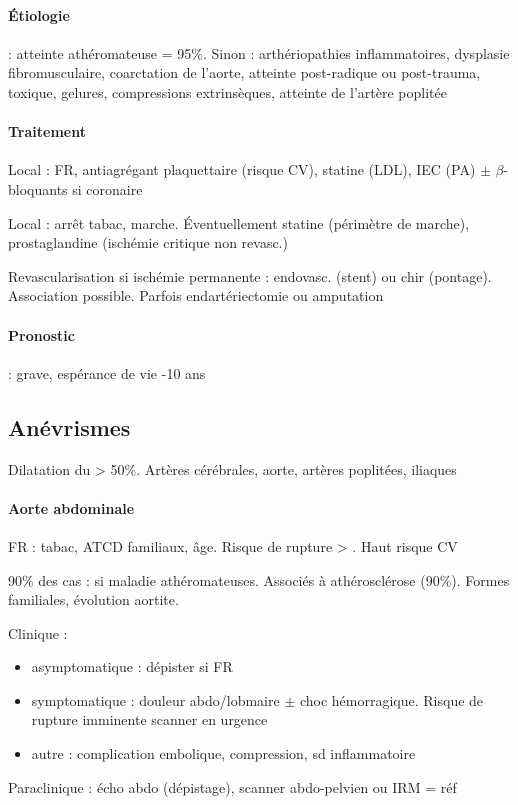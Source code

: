 \documentclass{article}
\begin{document}
\paragraph{Étiologie} : atteinte athéromateuse = 95\%. Sinon : arthériopathies
inflammatoires, dysplasie fibromusculaire, coarctation de l'aorte, atteinte
post-radique ou post-trauma, toxique, gelures, compressions extrinsèques,
atteinte de l'artère poplitée
    
\paragraph{Traitement}
Local : FR, antiagrégant plaquettaire (risque CV), statine (LDL), IEC (PA) $\pm$
$\beta$-bloquants si coronaire

Local : arrêt tabac, marche. Éventuellement statine (périmètre de marche),
prostaglandine (ischémie critique non revasc.)

Revascularisation si ischémie permanente : endovasc. (stent) ou chir (pontage).
Association possible. Parfois endartériectomie ou amputation

\paragraph{Pronostic} : grave, espérance de vie -10 ans

\subsection{Anévrismes}
Dilatation du \diameter{} > 50\%. Artères cérébrales, aorte, artères poplitées, iliaques

\paragraph{Aorte abdominale}
FR : tabac, ATCD familiaux, âge. Risque de rupture > \female. Haut risque CV

90\% des cas : si maladie athéromateuses. Associés à athérosclérose (90\%).
Formes familiales, évolution aortite.

Clinique : 
\begin{itemize}
  \item asymptomatique : dépister si FR
  \item symptomatique : douleur abdo/lobmaire $\pm$ choc hémorragique. Risque de
    rupture imminente \thus scanner en urgence \skull
  \item autre : complication embolique, compression, sd inflammatoire
\end{itemize}
Paraclinique : écho abdo (dépistage), scanner abdo-pelvien ou IRM = réf
\end{document}
